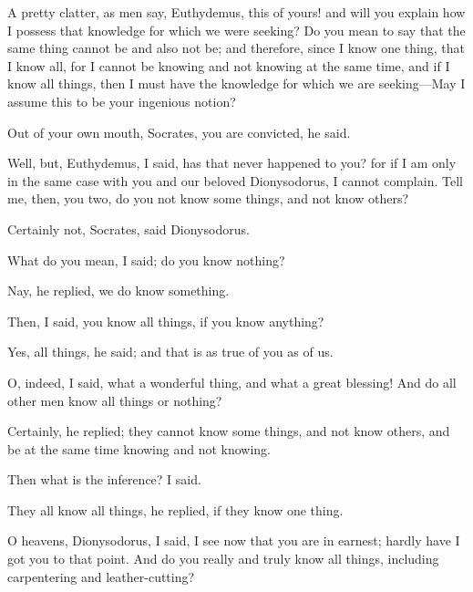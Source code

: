 \documentclass[11pt,letter]{article}
\begin{document}
\par  A pretty clatter, as men say, Euthydemus, this of yours! and will you explain how I possess that knowledge for which we were seeking? Do you mean to say that the same thing cannot be and also not be; and therefore, since I know one thing, that I know all, for I cannot be knowing and not knowing at the same time, and if I know all things, then I must have the knowledge for which we are seeking—May I assume this to be your ingenious notion?

\par  Out of your own mouth, Socrates, you are convicted, he said.

\par  Well, but, Euthydemus, I said, has that never happened to you? for if I am only in the same case with you and our beloved Dionysodorus, I cannot complain. Tell me, then, you two, do you not know some things, and not know others?

\par  Certainly not, Socrates, said Dionysodorus.

\par  What do you mean, I said; do you know nothing?

\par  Nay, he replied, we do know something.

\par  Then, I said, you know all things, if you know anything?

\par  Yes, all things, he said; and that is as true of you as of us.

\par  O, indeed, I said, what a wonderful thing, and what a great blessing! And do all other men know all things or nothing?

\par  Certainly, he replied; they cannot know some things, and not know others, and be at the same time knowing and not knowing.

\par  Then what is the inference? I said.

\par  They all know all things, he replied, if they know one thing.

\par  O heavens, Dionysodorus, I said, I see now that you are in earnest; hardly have I got you to that point. And do you really and truly know all things, including carpentering and leather-cutting?
\end{document}
